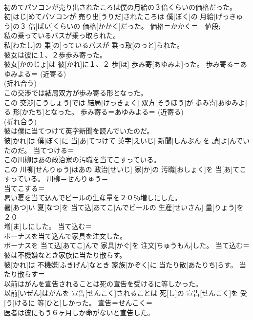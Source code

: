 \documentclass[8pt]{extreport}
\begin{document}
\begin{CJK}{UTF8}{min}
\\	初めてパソコンが売り出されたころは僕の月給の３倍くらいの価格だった。	
\\	初[はじ]めてパソコンが 売り出[うりだ]されたころは 僕[ぼく]の 月給[げっきゅう]の３ 倍[ばい]くらいの 価格[かかく]だった。	価格＝かかく＝　値段; 
\\	私の乗っているバスが乗っ取られた。	
\\	私[わたし]の 乗[の]っているバスが 乗っ取[のっと]られた。	
\\	彼女は彼に１、２歩歩み寄った。	
\\	彼女[かのじょ]は 彼[かれ]に１、２ 歩[ほ] 歩み寄[あゆみよ]った。	歩み寄る＝あゆみよる＝ (近寄る) 
\\	(折れ合う) 
\\	この交渉では結局双方が歩み寄る形となった。	
\\	この 交渉[こうしょう]では 結局[けっきょく] 双方[そうほう]が 歩み寄[あゆみよ]る 形[かたち]となった。	歩み寄る＝あゆみよる＝ (近寄る) 
\\	(折れ合う) 
\\	彼は僕に当てつけて英字新聞を読んでいたのだ。	
\\	彼[かれ]は 僕[ぼく]に 当[あ]てつけて 英字[えいじ] 新聞[しんぶん]を 読[よ]んでいたのだ。	当てつける＝ 
\\	この川柳はあの政治家の汚職を当てこすっている。	
\\	この 川柳[せんりゅう]はあの 政治[せいじ] 家[か]の 汚職[おしょく]を 当[あ]てこすっている。	川柳＝せんりゅう＝ 
\\	当てこする＝ 
\\	暑い夏を当て込んでビールの生産量を２０％増しにした。	
\\	暑[あつ]い 夏[なつ]を 当て込[あてこ]んでビールの 生産[せいさん] 量[りょう]を２０ 
\\	[ぱーせんと] 増[ま]しにした。	当て込む＝ 
\\	ボーナスを当て込んで家具を注文した。	
\\	ボーナスを 当て込[あてこ]んで 家具[かぐ]を 注文[ちゅうもん]した。	当て込む＝ 
\\	彼は不機嫌なとき家族に当たり散らす。	
\\	彼[かれ]は 不機嫌[ふきげん]なとき 家族[かぞく]に 当たり散[あたりち]らす。	当たり散らす＝ 
\\	以前はがんを宣告されることは死の宣告を受けるに等しかった。	
\\	以前[いぜん]はがんを 宣告[せんこく]されることは 死[し]の 宣告[せんこく]を 受[う]けるに 等[ひと]しかった。	宣告＝せんこく＝ 
\\	医者は彼にもう６ヶ月しか命がないと宣告した。	

\end{CJK}
\end{document}
